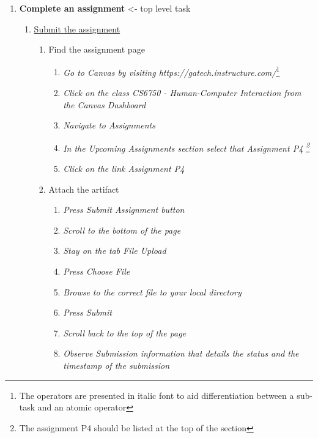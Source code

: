 \documentclass[12pt,letterpaper]{article}
\begin{document}
\begin{enumerate}
    \item \textbf{Complete an assignment} <- top level task
    \begin{enumerate}
        \item \underline{Submit the assignment}
            \begin{enumerate}
                \item Find the assignment page 
                \begin{enumerate}
                    \item \textit{Go to Canvas by visiting https://gatech.instructure.com/}\footnote{The operators are presented in italic font to aid differentiation between a sub-task and an atomic operator}
                    \item \textit{Click on the class CS6750 - Human-Computer Interaction from the Canvas Dashboard}
                    \item \textit{Navigate to Assignments}
                    \item \textit{In the Upcoming Assignments section select that Assignment P4 \footnote{The assignment P4 should be listed at the top of the section}}
                    \item \textit{Click on the link Assignment P4}
                \end{enumerate}
                \item Attach the artifact
                \begin{enumerate}
                    \item \textit{Press Submit Assignment button}
                    \item \textit{Scroll to the bottom of the page}
                    \item \textit{Stay on the tab File Upload}
                    \item \textit{Press Choose File}
                    \item \textit{Browse to the correct file to your local directory}
                    \item \textit{Press Submit}
                    \item \textit{Scroll back to the top of the page}
                    \item \textit{Observe Submission information that details the status and the timestamp of the submission}
                \end{enumerate}
            \end{enumerate}

\end{enumerate}
\end{enumerate}
\end{document}
